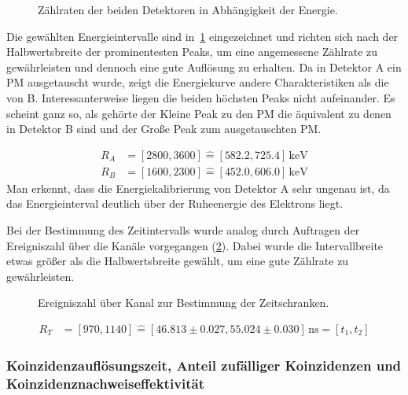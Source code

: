 \documentclass[slug=PET, room=Andreas-Schubert-Bau\,\ 424A,
supervisor=Carsten\ Bittrich, coursedate=10.\ 01.\ 2020, ngerman]{../../Lab_Report_LaTeX/lab_report}
\begin{document}
\begin{figure}[h]\centering
  
  \caption{Z\"ahlraten der beiden Detektoren in Abhängigkeit der Energie.}
  \label{fig:calibration-mid_over_energy}
\end{figure}

Die gew\"ahlten Energieintervalle sind
in~\ref{fig:calibration-mid_over_energy} eingezeichnet und richten
sich nach der Halbwertsbreite der prominentesten Peaks, um eine
angemessene Z\"ahlrate zu gew\"ahrleisten und dennoch eine gute
Auflösung zu erhalten. Da in Detektor A ein PM ausgetauscht wurde,
zeigt die Energiekurve andere Charakteristiken als die von
B. Interessanterweise liegen die beiden h\"ochsten Peaks nicht
aufeinander. Es scheint ganz so, als geh\"orte der Kleine Peak zu den
PM die \"aquivalent zu denen in Detektor B sind und der Gro\ss{}e Peak
zum ausgetauschten PM.

\begin{align}
  \label{eq:fenster}
  R_A &= [2800, 3600] \hat{=} [582.2, 725.4]\,\si{\kilo\electronvolt}
  \\
  R_B &= [1600, 2300] \hat{=} [452.0, 606.0]\,\si{\kilo\electronvolt}
\end{align}
Man erkennt, dass die Energiekalibrierung von Detektor A sehr ungenau
ist, da das Energieinterval deutlich \"uber der Ruheenergie des
Elektrons liegt.

Bei der Bestimmung des Zeitintervalls wurde analog durch Auftragen der
Ereigniszahl \"uber die Kan\"ale vorgegangen
(\ref{fig:calibration-time_range}). Dabei wurde die Intervallbreite
etwas gr\"o\ss{}er als die Halbwertsbreite gew\"ahlt, um eine gute
Z\"ahlrate zu gew\"ahrleisten.

\begin{figure}[h]\centering
  
  \caption{Ereigniszahl \"uber Kanal zur Bestimmung der Zeitschranken.}
  \label{fig:calibration-time_range}
\end{figure}

\begin{align}
  \label{eq:timeint}
  R_T &= [970, 1140] \hat{=} [46.813\pm 0.027, 55.024\pm
        0.030]\,\si{\nano\second} = [t_1, t_2]
\end{align}

\subsubsection{Koinzidenzaufl\"osungszeit, Anteil zuf\"alliger Koinzidenzen und Koinzidenznachweiseffektivit\"at}
\label{sec:koaufl}
\end{document}
